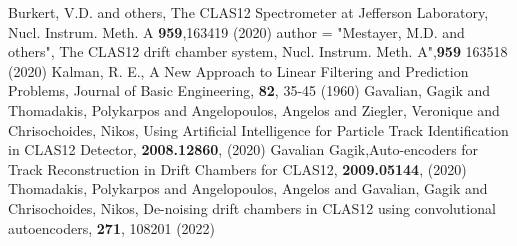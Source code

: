 \documentclass{webofc}
\begin{document}
\begin{thebibliography}{}
%
%
Burkert, V.D. and others, The CLAS12 Spectrometer at Jefferson Laboratory, Nucl. Instrum. Meth. A \textbf{959},163419 (2020)
    author = "Mestayer, M.D. and others", The CLAS12 drift chamber system, Nucl. Instrum. Meth. A",\textbf{959} 163518 (2020)
  Kalman, R. E., A New Approach to Linear Filtering and Prediction Problems, Journal of Basic Engineering, \textbf{82}, 35-45 (1960)
Gavalian, Gagik and Thomadakis, Polykarpos and Angelopoulos, Angelos and Ziegler, Veronique and Chrisochoides, Nikos, Using Artificial Intelligence for Particle Track Identification in CLAS12 Detector, \textbf{2008.12860}, (2020)
 Gavalian Gagik,Auto-encoders for Track Reconstruction in Drift Chambers for CLAS12, \textbf{2009.05144}, (2020)
   Thomadakis, Polykarpos and Angelopoulos, Angelos and Gavalian, Gagik and Chrisochoides, Nikos, De-noising drift chambers in CLAS12 using convolutional autoencoders, \textbf{271}, 108201 (2022)
\end{thebibliography}
\end{document}
